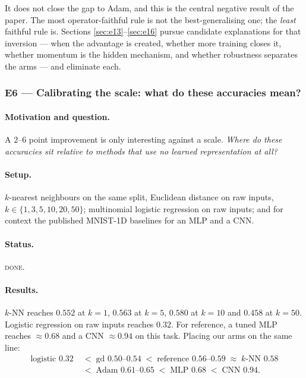 \documentclass{article} %
\theoremstyle{plain}
\theoremstyle{definition}
\theoremstyle{remark}
\begin{document}
It does not close the gap to Adam, and this is the central negative result of the paper. The most
operator-faithful rule is not the best-generalising one; the \emph{least} faithful rule is. Sections
\ref{sec:e13}--\ref{sec:e16} pursue candidate explanations for that inversion --- when the advantage
is created, whether more training closes it, whether momentum is the hidden mechanism, and whether
robustness separates the arms --- and eliminate each.

\subsubsection{E6 --- Calibrating the scale: what do these accuracies mean?}
\label{sec:e6}

\paragraph{Motivation and question.}
A $2$--$6$ point improvement is only interesting against a scale. \emph{Where do these accuracies
sit relative to methods that use no learned representation at all?}

\paragraph{Setup.} $k$-nearest neighbours on the same split, Euclidean distance on raw inputs,
$k \in \{1,3,5,10,20,50\}$; multinomial logistic regression on raw inputs; and for context the
published MNIST-1D baselines for an MLP and a CNN.

\paragraph{Status.} \textsc{done}.

\paragraph{Results.}
$k$-NN reaches $0.552$ at $k=1$, $0.563$ at $k=5$, $0.580$ at $k=10$ and $0.458$ at $k=50$.
Logistic regression on raw inputs reaches $0.32$. For reference, a tuned MLP reaches $\approx 0.68$
and a CNN $\approx 0.94$ on this task. Placing our arms on the same line:
\begin{align*}
 \text{logistic } 0.32 \;&<\;
 \text{gd } 0.50\text{--}0.54 \;<\;
 \text{reference } 0.56\text{--}0.59 \;\approx\; \text{$k$-NN } 0.58 \\
 &<\; \text{Adam } 0.61\text{--}0.65 \;<\; \text{MLP } 0.68 \;<\; \text{CNN } 0.94 .
\end{align*}
\end{document}
